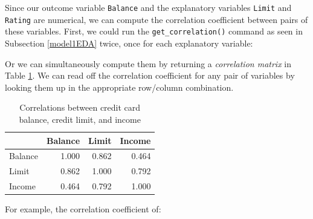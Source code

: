 \documentclass[12pt,]{krantz}
\makeatletter
\newenvironment{Shaded}{\begin{snugshade}}{\end{snugshade}}
\newcommand{\KeywordTok}[1]{\textcolor[rgb]{0.27,0.27,0.27}{\textbf{#1}}}
\newcommand{\StringTok}[1]{\textcolor[rgb]{0.5,0.5,0.5}{#1}}
\newcommand{\OperatorTok}[1]{\textcolor[rgb]{0.43,0.43,0.43}{\textbf{#1}}}
\newcommand{\NormalTok}[1]{#1}
\newenvironment{kframe}{%
\medskip{}
\setlength{\fboxsep}{.8em}
 \def\at@end@of@kframe{}%
 \ifinner\ifhmode%
  \def\at@end@of@kframe{\end{minipage}}%
  \begin{minipage}{\columnwidth}%
 \fi\fi%
 \def\FrameCommand##1{\hskip\@totalleftmargin \hskip-\fboxsep
 \colorbox{shadecolor}{##1}\hskip-\fboxsep
     \hskip-\linewidth \hskip-\@totalleftmargin \hskip\columnwidth}%
 \MakeFramed {\advance\hsize-\width
   \@totalleftmargin\z@ \linewidth\hsize
   \@setminipage}}%
 {\par\unskip\endMakeFramed%
 \at@end@of@kframe}
\renewenvironment{Shaded}{\begin{kframe}}{\end{kframe}}
\theoremstyle{definition}
\theoremstyle{definition}
\theoremstyle{definition}
\theoremstyle{remark}
\makeatother
\begin{document}
Since our outcome variable \texttt{Balance} and the explanatory
variables \texttt{Limit} and \texttt{Rating} are numerical, we can
compute the correlation coefficient between pairs of these variables.
First, we could run the \texttt{get\_correlation()} command as seen in
Subsection \ref{model1EDA} twice, once for each explanatory variable:

\begin{Shaded}
\end{Shaded}

Or we can simultaneously compute them by returning a \emph{correlation
matrix} in Table \ref{tab:model3-correlation}. We can read off the
correlation coefficient for any pair of variables by looking them up in
the appropriate row/column combination.

\begin{Shaded}
\end{Shaded}

\begin{table}[H]

\caption{\label{tab:model3-correlation}Correlations between credit card balance, credit limit, and income}
\centering
\fontsize{10}{12}\selectfont
\begin{tabular}[t]{lrrr}
\toprule
  & Balance & Limit & Income\\
\midrule
Balance & 1.000 & 0.862 & 0.464\\
Limit & 0.862 & 1.000 & 0.792\\
Income & 0.464 & 0.792 & 1.000\\
\bottomrule
\end{tabular}
\end{table}

For example, the correlation coefficient of:
\end{document}
